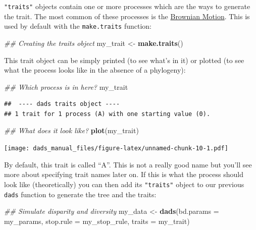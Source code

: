\documentclass[]{book}
\newenvironment{Shaded}{\begin{snugshade}}{\end{snugshade}}
\newcommand{\CommentTok}[1]{\textcolor[rgb]{0.56,0.35,0.01}{\textit{#1}}}
\newcommand{\DataTypeTok}[1]{\textcolor[rgb]{0.13,0.29,0.53}{#1}}
\newcommand{\KeywordTok}[1]{\textcolor[rgb]{0.13,0.29,0.53}{\textbf{#1}}}
\newcommand{\NormalTok}[1]{#1}
\newcommand{\StringTok}[1]{\textcolor[rgb]{0.31,0.60,0.02}{#1}}
\begin{document}
\texttt{"traits"} objects contain one or more processes which are the ways to generate the trait.
The most common of these processes is the \href{https://en.wikipedia.org/wiki/Brownian_motion}{Brownian Motion}.
This is used by default with the \texttt{make.traits} function:

\begin{Shaded}
\begin{Highlighting}[]
\CommentTok{## Creating the traits object}
\NormalTok{my_trait <-}\StringTok{ }\KeywordTok{make.traits}\NormalTok{()}
\end{Highlighting}
\end{Shaded}

This trait object can be simply printed (to see what's in it) or plotted (to see what the process looks like in the absence of a phylogeny):

\begin{Shaded}
\begin{Highlighting}[]
\CommentTok{## Which process is in here?}
\NormalTok{my_trait}
\end{Highlighting}
\end{Shaded}

\begin{verbatim}
##  ---- dads traits object ---- 
## 1 trait for 1 process (A) with one starting value (0).
\end{verbatim}

\begin{Shaded}
\begin{Highlighting}[]
\CommentTok{## What does it look like?}
\KeywordTok{plot}\NormalTok{(my_trait)}
\end{Highlighting}
\end{Shaded}

\texttt{[image: dads\_manual\_files/figure-latex/unnamed-chunk-10-1.pdf]}

By default, this trait is called ``A''.
This is not a really good name but you'll see more about specifying trait names later on.
If this is what the process should look like (theoretically) you can then add its \texttt{"traits"} object to our previous \texttt{dads} function to generate the tree and the traits:

\begin{Shaded}
\begin{Highlighting}[]
\CommentTok{## Simulate disparity and diversity}
\NormalTok{my_data <-}\StringTok{ }\KeywordTok{dads}\NormalTok{(}\DataTypeTok{bd.params =}\NormalTok{ my_params,}
                \DataTypeTok{stop.rule =}\NormalTok{ my_stop_rule,}
                \DataTypeTok{traits    =}\NormalTok{ my_trait)}
\end{Highlighting}
\end{Shaded}
\end{document}
